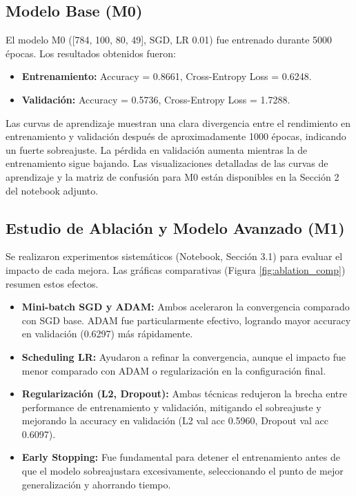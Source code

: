 \documentclass[11pt]{article}
\begin{document}
\subsection{Modelo Base (M0)}
El modelo M0 ([784, 100, 80, 49], SGD, LR 0.01) fue entrenado durante 5000 épocas. Los resultados obtenidos fueron:
\begin{itemize}
    \item \textbf{Entrenamiento:} Accuracy = 0.8661, Cross-Entropy Loss = 0.6248.
    \item \textbf{Validación:} Accuracy = 0.5736, Cross-Entropy Loss = 1.7288.
\end{itemize}

Las curvas de aprendizaje muestran una clara divergencia entre el rendimiento en entrenamiento y validación después de aproximadamente 1000 épocas, indicando un fuerte sobreajuste. La pérdida en validación aumenta mientras la de entrenamiento sigue bajando. Las visualizaciones detalladas de las curvas de aprendizaje y la matriz de confusión para M0 están disponibles en la Sección 2 del notebook adjunto.

\subsection{Estudio de Ablación y Modelo Avanzado (M1)}
Se realizaron experimentos sistemáticos (Notebook, Sección 3.1) para evaluar el impacto de cada mejora. Las gráficas comparativas (Figura \ref{fig:ablation_comp}) resumen estos efectos.
\begin{itemize}
    \item \textbf{Mini-batch SGD y ADAM:} Ambos aceleraron la convergencia comparado con SGD base. ADAM fue particularmente efectivo, logrando mayor accuracy en validación (0.6297) más rápidamente.
    \item \textbf{Scheduling LR:} Ayudaron a refinar la convergencia, aunque el impacto fue menor comparado con ADAM o regularización en la configuración final.
    \item \textbf{Regularización (L2, Dropout):} Ambas técnicas redujeron la brecha entre performance de entrenamiento y validación, mitigando el sobreajuste y mejorando la accuracy en validación (L2 val acc 0.5960, Dropout val acc 0.6097).
    \item \textbf{Early Stopping:} Fue fundamental para detener el entrenamiento antes de que el modelo sobreajustara excesivamente, seleccionando el punto de mejor generalización y ahorrando tiempo.
\end{itemize}
\end{document}
